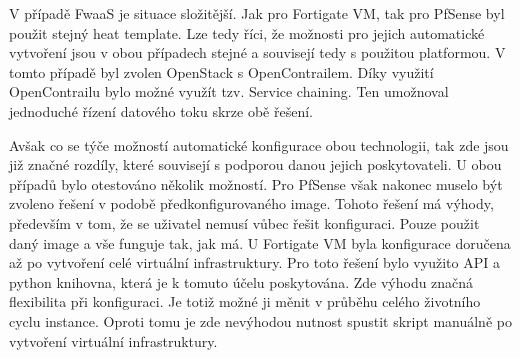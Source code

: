 V případě FwaaS je situace složitější. Jak pro Fortigate VM, tak pro PfSense byl použit stejný heat template. Lze tedy říci, že možnosti pro jejich automatické vytvoření jsou v obou případech stejné a souvisejí tedy s použitou platformou. V tomto případě byl zvolen OpenStack s OpenContrailem. Díky využití OpenContrailu bylo možné využít tzv. Service chaining. Ten umožnoval jednoduché řízení datového toku skrze obě řešení. 

Avšak co se týče možností automatické konfigurace obou technologii, tak zde jsou již značné rozdíly, které souvisejí s podporou danou jejich poskytovateli. U obou případů bylo otestováno několik možností. Pro PfSense však nakonec muselo být zvoleno řešení v podobě předkonfigurovaného image. Tohoto řešení má výhody, především v tom, že se uživatel nemusí vůbec řešit konfiguraci. Pouze použit daný image a vše funguje tak, jak má. U Fortigate VM byla konfigurace doručena až po vytvoření celé virtuální infrastruktury. Pro toto řešení bylo využito API a python knihovna, která je k tomuto účelu poskytována. Zde výhodu značná flexibilita při konfiguraci. Je totiž možné ji měnit v průběhu celého životního cyclu instance. Oproti tomu je zde nevýhodou nutnost spustit skript manuálně po vytvoření virtuální infrastruktury.

